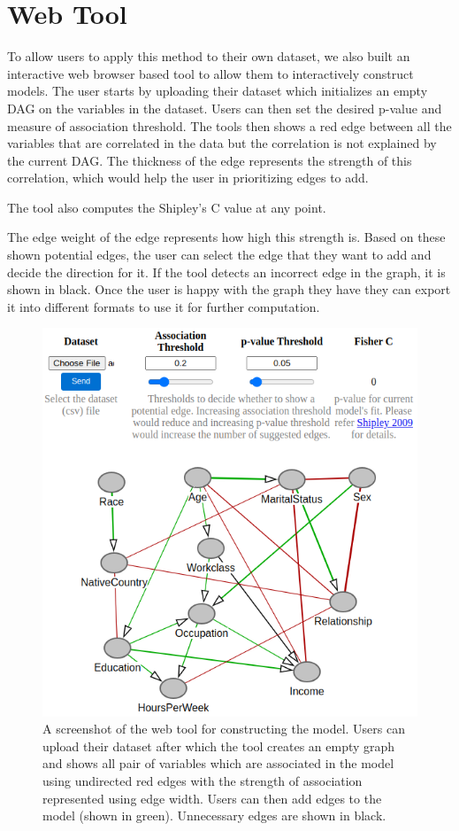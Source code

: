 \documentclass{uai2025} %
\begin{document}
\section{Web Tool}
\label{sec:web}

To allow users to apply this method to their own dataset, we also built an
interactive web browser based tool to allow them to interactively construct
models. The user starts by uploading their dataset which initializes an empty
DAG on the variables in the dataset. Users can then set the desired p-value
and measure of association threshold. The tools then shows a red edge between
all the variables that are correlated in the data but the correlation is not
explained by the current DAG. The thickness of the edge represents the strength
of this correlation, which would help the user in prioritizing edges to add.

The tool also computes the
Shipley's C value at any point. 

The edge
weight of the edge represents how high this strength is. 
Based on these shown potential edges, the user can select the edge that
they want to add and decide the direction for it. If the tool detects an
incorrect edge in the graph, it is shown in black. Once the user is happy with
the graph they have they can export it into different formats to use it for
further computation.

\begin{figure}
	\centering
	\includegraphics[scale=0.4]{../code/plots/web_tool_full.png}
	\caption{A screenshot of the web tool for constructing the model. Users
		can upload their dataset after which the tool creates an empty
		graph and shows all pair of variables which are associated in
		the model using undirected red edges with the strength of
		association represented using edge width. Users can then add
		edges to the model (shown in green). Unnecessary edges are shown in 
		black.}
\end{figure}
\end{document}
